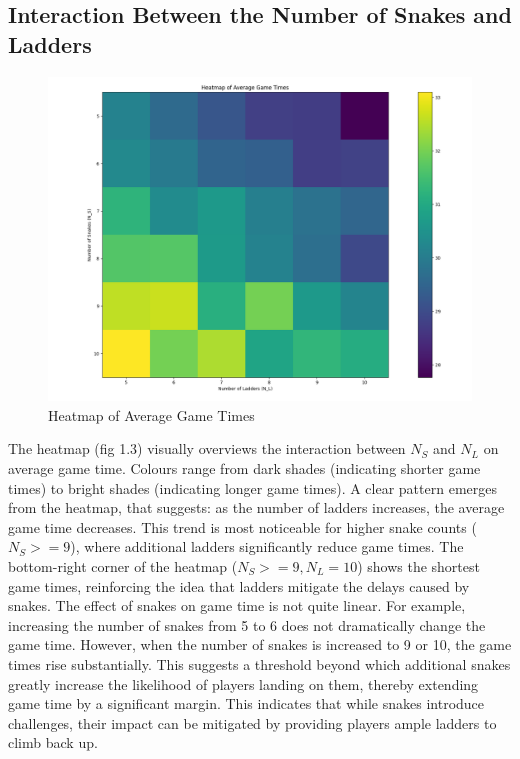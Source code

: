 \documentclass[12pt]{report}
\begin{document}
	\subsection{Interaction Between the Number of Snakes and Ladders}
\begin{figure}[h]
	\centering
	\includegraphics[width=0.8\linewidth]{Heatmap}
	\caption{Heatmap of Average Game Times}
	\label{fig:heatmap}
\end{figure}
	The heatmap (fig 1.3) visually overviews the interaction between $N_{S}$ and $N_{L}$ on average game time. Colours range from dark shades (indicating shorter game times) to bright shades (indicating longer game times). A clear pattern emerges from the heatmap, that suggests: as the number of ladders increases, the average game time decreases. This trend is most noticeable for higher snake counts ($N_{S} >= 9$), where additional ladders significantly reduce game times. The bottom-right corner of the heatmap ($N_{S} >= 9, N_{L} = 10$) shows the shortest game times, reinforcing the idea that ladders mitigate the delays caused by snakes. The effect of snakes on game time is not quite linear. For example, increasing the number of snakes from 5 to 6 does not dramatically change the game time. However, when the number of snakes is increased to 9 or 10, the game times rise substantially. This suggests a threshold beyond which additional snakes greatly increase the likelihood of players landing on them, thereby extending game time by a significant margin. This indicates that while snakes introduce challenges, their impact can be mitigated by providing players ample ladders to climb back up.
	
\end{document}
